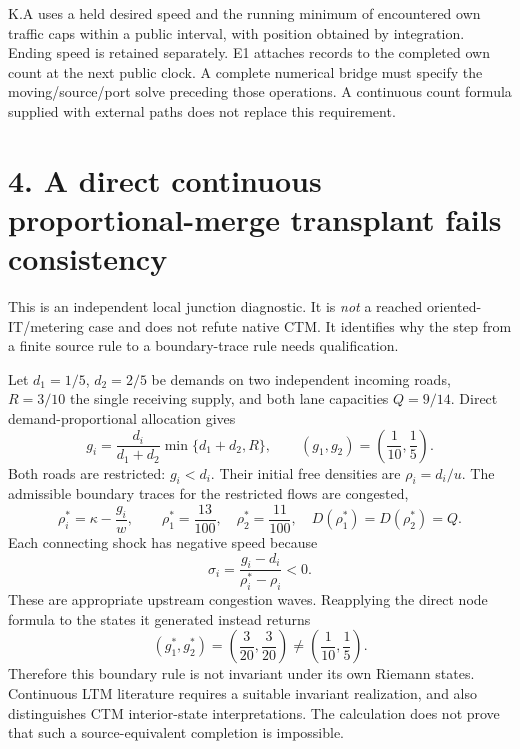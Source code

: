 \documentclass[11pt,a4paper]{article}
\begin{document}
K.A uses a held desired speed and the running minimum of encountered own
traffic caps within a public interval, with position obtained by integration.
Ending speed is retained separately. E1 attaches records to the completed
own count at the next public clock. A complete numerical bridge must specify
the moving/source/port solve preceding those operations. A continuous count
formula supplied with external paths does not replace this requirement.

\newpage
\section*{4. A direct continuous proportional-merge transplant fails consistency}
This is an independent local junction diagnostic. It is \emph{not} a reached
oriented-IT/metering case and does not refute native CTM. It identifies why
the step from a finite source rule to a boundary-trace rule needs qualification.

Let $d_1=1/5$, $d_2=2/5$ be demands on two independent incoming roads,
$R=3/10$ the single receiving supply, and both lane capacities
$Q=9/14$. Direct demand-proportional allocation gives
\begin{equation}
 g_i=\frac{d_i}{d_1+d_2}\min\{d_1+d_2,R\},\qquad
 (g_1,g_2)=\left(\frac1{10},\frac15\right).
\end{equation}
Both roads are restricted: $g_i<d_i$. Their initial free densities are
$\rho_i=d_i/u$. The admissible boundary traces for the restricted flows are
congested,
\begin{equation}
 \rho_i^*=\kappa-\frac{g_i}{w},\qquad
 \rho_1^*=\frac{13}{100},\quad \rho_2^*=\frac{11}{100},\quad
 D(\rho_1^*)=D(\rho_2^*)=Q.
\end{equation}
Each connecting shock has negative speed because
\begin{equation}
 \sigma_i=\frac{g_i-d_i}{\rho_i^*-\rho_i}<0.
\end{equation}
These are appropriate upstream congestion waves. Reapplying the direct node
formula to the states it generated instead returns
\begin{equation}
 (g_1^*,g_2^*)=\left(\frac3{20},\frac3{20}\right)
 \ne\left(\frac1{10},\frac15\right).
\end{equation}
Therefore this boundary rule is not invariant under its own Riemann states.
Continuous LTM literature requires a suitable invariant realization, and also
distinguishes CTM interior-state interpretations. The calculation does not
prove that such a source-equivalent completion is impossible.
\end{document}

